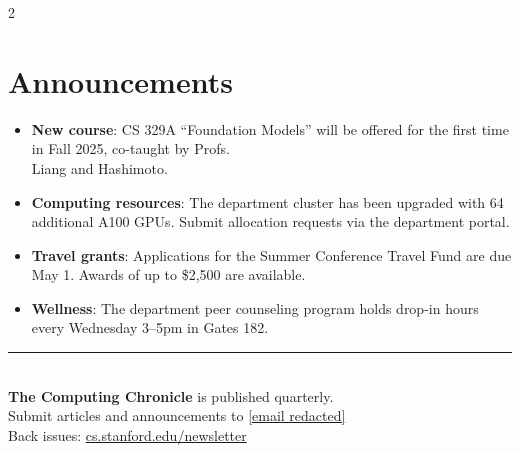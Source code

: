 \documentclass[10pt,a4paper]{article}
\begin{document}
\begin{multicols}{2}
\begin{center}
\end{center}

\section{Announcements}

\begin{itemize}[leftmargin=1.2em, itemsep=4pt]
  \item \textbf{New course}: CS 329A ``Foundation Models'' will be offered for the first time in Fall 2025, co-taught by Profs.\\ Liang and Hashimoto.
  \item \textbf{Computing resources}: The department cluster has been upgraded with 64 additional A100 GPUs. Submit allocation requests via the department portal.
  \item \textbf{Travel grants}: Applications for the Summer Conference Travel Fund are due May 1. Awards of up to \$2,500 are available.
  \item \textbf{Wellness}: The department peer counseling program holds drop-in hours every Wednesday 3--5pm in Gates 182.
\end{itemize}

\vspace{0.5cm}
\begin{center}
{\color{rulecolor}\rule{0.8\columnwidth}{0.5pt}}\\[6pt]
{\small\color{darktext}
\textbf{The Computing Chronicle} is published quarterly.\\
Submit articles and announcements to \href{mailto:[email redacted]}{[email redacted]}\\
Back issues: \href{https://cs.stanford.edu/newsletter}{cs.stanford.edu/newsletter}}
\end{center}

\end{multicols}
\end{document}
